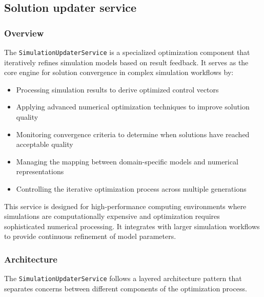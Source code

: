 \subsection{Solution updater service}
\subsubsection{Overview}

The \texttt{SimulationUpdaterService} is a specialized optimization component that iteratively refines simulation models based on result feedback. It serves as the core engine for solution convergence in complex simulation workflows by:

\begin{itemize}
	\item Processing simulation results to derive optimized control vectors
	\item Applying advanced numerical optimization techniques to improve solution quality
	\item Monitoring convergence criteria to determine when solutions have reached acceptable quality
	\item Managing the mapping between domain-specific models and numerical representations
	\item Controlling the iterative optimization process across multiple generations
\end{itemize}

This service is designed for high-performance computing environments where simulations are computationally expensive and optimization requires sophisticated numerical processing. It integrates with larger simulation workflows to provide continuous refinement of model parameters.

\subsubsection{Architecture}

The \texttt{SimulationUpdaterService} follows a layered architecture pattern that separates concerns between different components of the optimization process.

